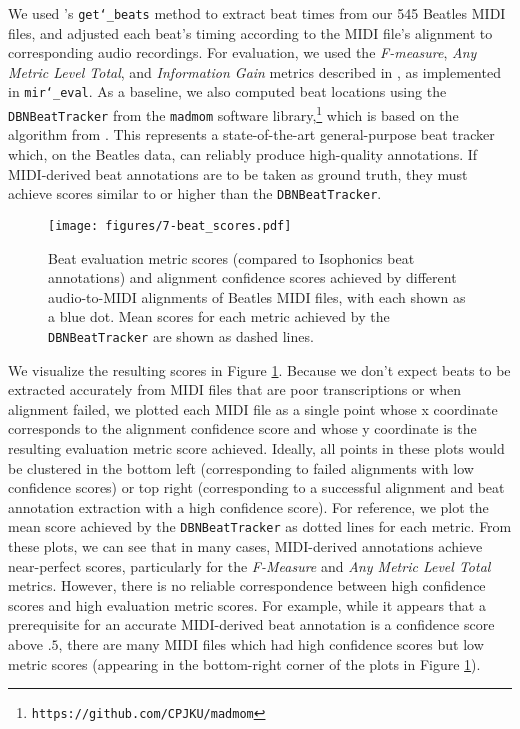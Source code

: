 We used \prettymidi{}'s \texttt{get\char`_beats} method to extract beat times from our 545 Beatles MIDI files, and adjusted each beat's timing according to the MIDI file's alignment to corresponding audio recordings.
For evaluation, we used the {\em F-measure}, {\em Any Metric Level Total}, and {\em Information Gain} metrics described in \cite{davies2009evaluation}, as implemented in \texttt{mir\char`_eval}.
As a baseline, we also computed beat locations using the \texttt{DBNBeatTracker} from the \texttt{madmom} software library,\footnote{\texttt{https://github.com/CPJKU/madmom}} which is based on the algorithm from \cite{bock2014multi}.
This represents a state-of-the-art general-purpose beat tracker which, on the Beatles data, can reliably produce high-quality annotations.
If MIDI-derived beat annotations are to be taken as ground truth, they must achieve scores similar to or higher than the \texttt{DBNBeatTracker}.

\begin{figure}
    \centering
    \texttt{[image: figures/7-beat\_scores.pdf]}
    \caption[Beat evaluation and alignment confidence scores]{Beat evaluation metric scores (compared to Isophonics beat annotations) and alignment confidence scores achieved by different audio-to-MIDI alignments of Beatles MIDI files, with each shown as a blue dot.
Mean scores for each metric achieved by the \texttt{DBNBeatTracker} \cite{bock2014multi} are shown as dashed lines.}
    \label{fig:beat}
\end{figure}

We visualize the resulting scores in Figure \ref{fig:beat}.
Because we don't expect beats to be extracted accurately from MIDI files that are poor transcriptions or when alignment failed, we plotted each MIDI file as a single point whose x coordinate corresponds to the alignment confidence score and whose y coordinate is the resulting evaluation metric score achieved.
Ideally, all points in these plots would be clustered in the bottom left (corresponding to failed alignments with low confidence scores) or top right (corresponding to a successful alignment and beat annotation extraction with a high confidence score).
For reference, we plot the mean score achieved by the \texttt{DBNBeatTracker} as dotted lines for each metric.
From these plots, we can see that in many cases, MIDI-derived annotations achieve near-perfect scores, particularly for the {\em F-Measure} and {\em Any Metric Level Total} metrics.
However, there is no reliable correspondence between high confidence scores and high evaluation metric scores.
For example, while it appears that a prerequisite for an accurate MIDI-derived beat annotation is a confidence score above $.5$, there are many MIDI files which had high confidence scores but low metric scores (appearing in the bottom-right corner of the plots in Figure \ref{fig:beat}).


